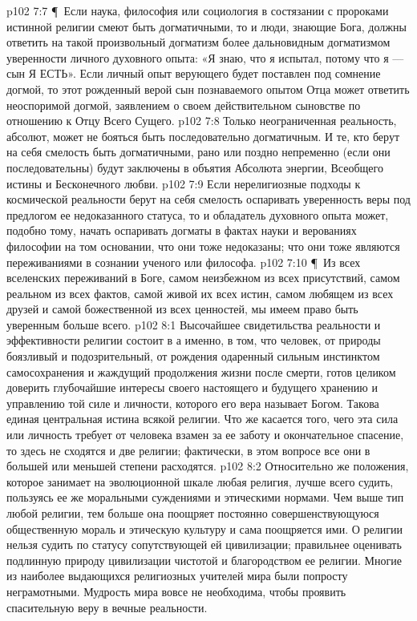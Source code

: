 \vs p102 7:7 \P\ Если наука, философия или социология в состязании с пророками истинной религии смеют быть догматичными, то и люди, знающие Бога, должны ответить на такой произвольный догматизм более дальновидным догматизмом уверенности личного духовного опыта: «Я знаю, что я испытал, потому что я --- сын Я ЕСТЬ». Если личный опыт верующего будет поставлен под сомнение догмой, то этот рожденный верой сын познаваемого опытом Отца может ответить неоспоримой догмой, заявлением о своем действительном сыновстве по отношению к Отцу Всего Сущего.
\vs p102 7:8 Только неограниченная реальность, абсолют, может не бояться быть последовательно догматичным. И те, кто берут на себя смелость быть догматичными, рано или поздно непременно (если они последовательны) будут заключены в объятия Абсолюта энергии, Всеобщего истины и Бесконечного любви.
\vs p102 7:9 Если нерелигиозные подходы к космической реальности берут на себя смелость оспаривать уверенность веры под предлогом ее недоказанного статуса, то и обладатель духовного опыта может, подобно тому, начать оспаривать догматы в фактах науки и верованиях философии на том основании, что они тоже недоказаны; что они тоже являются переживаниями в сознании ученого или философа.
\vs p102 7:10 \P\ Из всех вселенских переживаний в Боге, самом неизбежном из всех присутствий, самом реальном из всех фактов, самой живой их всех истин, самом любящем из всех друзей и самой божественной из всех ценностей, мы имеем право быть уверенным больше всего.
\vs p102 8:1 Высочайшее свидетильства реальности и эффективности религии состоит в  а именно, в том, что человек, от природы боязливый и подозрительный, от рождения одаренный сильным инстинктом самосохранения и жаждущий продолжения жизни после смерти, готов целиком доверить глубочайшие интересы своего настоящего и будущего хранению и управлению той силе и личности, которого его вера называет Богом. Такова единая центральная истина всякой религии. Что же касается того, чего эта сила или личность требует от человека взамен за ее заботу и окончательное спасение, то здесь не сходятся и две религии; фактически, в этом вопросе все они в большей или меньшей степени расходятся.
\vs p102 8:2 Относительно же положения, которое занимает на эволюционной шкале любая религия, лучше всего судить, пользуясь ее же моральными суждениями и этическими нормами. Чем выше тип любой религии, тем больше она поощряет постоянно совершенствующуюся общественную мораль и этическую культуру и сама поощряется ими. О религии нельзя судить по статусу сопутствующей ей цивилизации; правильнее оценивать подлинную природу цивилизации чистотой и благородством ее религии. Многие из наиболее выдающихся религиозных учителей мира были попросту неграмотными. Мудрость мира вовсе не необходима, чтобы проявить спасительную веру в вечные реальности.
